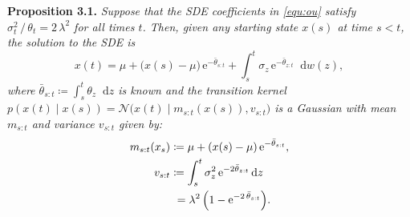 \documentclass{article}
\newcommand{\diff}{\mathop{}\!\mathrm{d}}
\newcommand{\expp}{\mathrm{e}}
\newcommand{\cond}{{\;|\;}}
\theoremstyle{plain}
\theoremstyle{definition}
\theoremstyle{remark}
\begin{document}
\textbf{Proposition 3.1.}
\label{prf:SDE_solution}
\textit{Suppose that the SDE coefficients in \eqref{equ:ou} satisfy $\sigma_t^2 \, / \, \theta_t = 2 \, \lambda^2$ for all times $t$. Then, given any starting state ${x}(s)$ at time $s < t$, the solution to the SDE is
\begin{equation}
        {x}(t) = \mu + \bigl({x}(s) - \mu \bigr) \, \expp^{-\bar{\theta}_{s:t}} + \int^t_s \sigma_z \, \expp^{-\bar{\theta}_{z:t}} \diff w(z),
    \end{equation}
where $\bar{\theta}_{s:t} \coloneqq \int^t_s \theta_z \diff z$ is known and the transition kernel $p({x}(t) \cond {x}(s)) = \mathcal{N}\bigl({x}(t) \cond m_{s:t}({x}(s)), v_{s:t}\bigr)$ is a Gaussian with mean $m_{s:t}$ and variance $v_{s:t}$ given by:
    \begin{equation}
        \begin{split}
        m_{s:t}(x_s) &\coloneqq \mu + ({x}(s) - \mu) \, \expp^{-\bar{\theta}_{s:t}}, \\
        v_{s:t} &\coloneqq \int^t_s \sigma_z^2 \, \expp^{-2\bar{\theta}_{z:t}} \diff z \\
        & \ = \lambda^2 \, \Bigl(1 - \expp^{-2 \, \bar{\theta}_{s:t}}\Bigr).
        \end{split}
    \end{equation}
}
\end{document}
